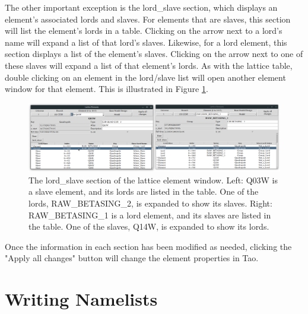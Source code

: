 The other important exception is the lord_slave section, which displays an element's associated lords and slaves.
For elements that are slaves, this section will list the element's lords in a table.
Clicking on the arrow next to a lord's name will expand a list of that lord's slaves.
Likewise, for a lord element, this section displays a list of the element's slaves.
Clicking on the arrow next to one of these slaves will expand a list of that element's lords.
As with the lattice table, double clicking on an element in the lord/slave list will open another element window for that element.
This is illustrated in Figure \ref{fig:gui.lat.element.lordslave}.
\begin{figure}
\centering
\includegraphics[width=12cm]{figures/lat_lord_slave.png}
\caption{The lord_slave section of the lattice element window.
Left: Q03W is a slave element, and its lords are listed in the table.
One of the lords, RAW_BETASING_2, is expanded to show its slaves.
Right: RAW_BETASING_1 is a lord element, and its slaves are listed in the table.
One of the slaves, Q14W, is expanded to show its lords.}
\label{fig:gui.lat.element.lordslave}
\end{figure}

Once the information in each section has been modified as needed, clicking the "Apply all changes" button will change the element properties in Tao.


\section{Writing Namelists}
\label{s:gui.namelist}
